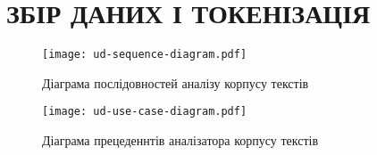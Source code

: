 \section{ЗБІР ДАНИХ І ТОКЕНІЗАЦІЯ}

\begin{figure}[h]
  \begin{center}
    \texttt{[image: ud-sequence-diagram.pdf]}
  \end{center}
  \caption{Діаграма послідовностей аналізу корпусу текстів}
  \label{img:sequence_diagram}
\end{figure}

\newpage

\begin{figure}[h]
  \begin{center}
    \texttt{[image: ud-use-case-diagram.pdf]}
  \end{center}
  \caption{Діаграма прецеденнтів аналізатора корпусу текстів}
  \label{img:use_case_diagram}
\end{figure}